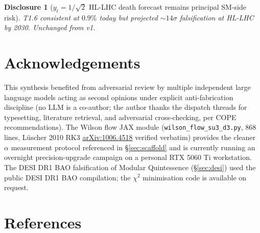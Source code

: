 \documentclass[11pt,a4paper]{article}
\newtheorem{disclosure}{Disclosure}
\begin{document}
\begin{disclosure}[$y_t = 1/\sqrt{2}$ HL-LHC death forecast remains principal SM-side risk]
T1.6 consistent at $0.9\%$ today but projected $\sim 14\sigma$ falsification at HL-LHC by 2030. Unchanged from v1.
\end{disclosure}

\section*{Acknowledgements}

This synthesis benefited from adversarial review by multiple independent large language models acting as second opinions under explicit anti-fabrication discipline (no LLM is a co-author; the author thanks the dispatch threads for typesetting, literature retrieval, and adversarial cross-checking, per COPE recommendations). The Wilson flow JAX module (\texttt{wilson\_flow\_su3\_d3.py}, 868 lines, Lüscher 2010 RK3 \href{https://arxiv.org/abs/1006.4518}{arXiv:1006.4518} verified verbatim) provides the cleaner $\alpha$ measurement protocol referenced in \S\ref{sec:scaffold} and is currently running an overnight precision-upgrade campaign on a personal RTX 5060 Ti workstation. The DESI DR1 BAO falsification of Modular Quintessence (\S\ref{sec:desi}) used the public DESI DR1 BAO compilation; the $\chi^2$ minimisation code is available on request.

\section*{References}
\end{document}
